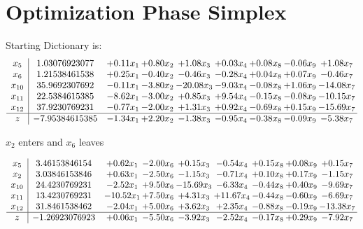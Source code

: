 \documentclass[9pt]{article}
\begin{document}
\section{Optimization Phase Simplex}
Starting Dictionary is:
\[\begin{array}{c| c c@{\hskip 2pt} c@{\hskip 2pt} c@{\hskip 2pt} c@{\hskip 2pt} c@{\hskip 2pt} c@{\hskip 2pt} c@{\hskip 2pt} }
 x_{5}   &  1.03076923077 & +  0.11 x_{1} & +  0.80 x_{2} & +  1.08 x_{3} & +  0.03 x_{4} & +  0.08 x_{8} & -0.06 x_{9} & +  1.08 x_{7}\\
 x_{6}   &  1.21538461538 & +  0.25 x_{1} & -0.40 x_{2} & -0.46 x_{3} & -0.28 x_{4} & +  0.04 x_{8} & +  0.07 x_{9} & -0.46 x_{7}\\
 x_{10}   &  35.9692307692 & -0.11 x_{1} & -3.80 x_{2} & -20.08 x_{3} & -9.03 x_{4} & -0.08 x_{8} & +  1.06 x_{9} & -14.08 x_{7}\\
 x_{11}   &  22.5384615385 & -8.62 x_{1} & -3.00 x_{2} & +  0.85 x_{3} & +  9.54 x_{4} & -0.15 x_{8} & -0.08 x_{9} & -10.15 x_{7}\\
 x_{12}   &  37.9230769231 & -0.77 x_{1} & -2.00 x_{2} & +  1.31 x_{3} & +  0.92 x_{4} & -0.69 x_{8} & +  0.15 x_{9} & -15.69 x_{7}\\
\hline
z    &  -7.95384615385 & -1.34 x_{1} & +  2.20 x_{2} & -1.38 x_{3} & -0.95 x_{4} & -0.38 x_{8} & -0.09 x_{9} & -5.38 x_{7}\\
\end{array}\]


 $ x_{2} $ enters and $ x_{6} $ leaves 

 \[\begin{array}{c| c c@{\hskip 2pt} c@{\hskip 2pt} c@{\hskip 2pt} c@{\hskip 2pt} c@{\hskip 2pt} c@{\hskip 2pt} c@{\hskip 2pt} }
 x_{5}   &  3.46153846154 & +  0.62 x_{1} & -2.00 x_{6} & +  0.15 x_{3} & -0.54 x_{4} & +  0.15 x_{8} & +  0.08 x_{9} & +  0.15 x_{7}\\
 x_{2}   &  3.03846153846 & +  0.63 x_{1} & -2.50 x_{6} & -1.15 x_{3} & -0.71 x_{4} & +  0.10 x_{8} & +  0.17 x_{9} & -1.15 x_{7}\\
 x_{10}   &  24.4230769231 & -2.52 x_{1} & +  9.50 x_{6} & -15.69 x_{3} & -6.33 x_{4} & -0.44 x_{8} & +  0.40 x_{9} & -9.69 x_{7}\\
 x_{11}   &  13.4230769231 & -10.52 x_{1} & +  7.50 x_{6} & +  4.31 x_{3} & + 11.67 x_{4} & -0.44 x_{8} & -0.60 x_{9} & -6.69 x_{7}\\
 x_{12}   &  31.8461538462 & -2.04 x_{1} & +  5.00 x_{6} & +  3.62 x_{3} & +  2.35 x_{4} & -0.88 x_{8} & -0.19 x_{9} & -13.38 x_{7}\\
\hline
z    &  -1.26923076923 & +  0.06 x_{1} & -5.50 x_{6} & -3.92 x_{3} & -2.52 x_{4} & -0.17 x_{8} & +  0.29 x_{9} & -7.92 x_{7}\\
\end{array}\]
\end{document}
